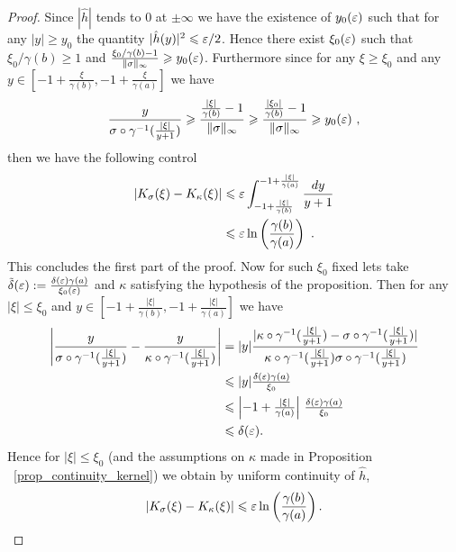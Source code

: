 \begin{proof}
	Since $|\hat{h}|$ tends to $0$ at $\pm\infty$ we have the existence of $y_0(\varepsilon)$ such that for any $|y|\geqslant y_0$ the quantity $|\hat{h}(y)|^2 \leqslant \varepsilon/2$. Hence there exist $\xi_0(\varepsilon)$ such that $\xi_0/\gamma(b)\geqslant 1$ and $\frac{\xi_0/\gamma(b) -1}{\|\sigma\|_\infty} \geqslant y_0(\varepsilon)$.
	Furthermore since for any $\xi\geqslant \xi_0$ and any $y\in[-1+\frac{\xi}{\gamma(b)},-1+\frac{\xi}{\gamma(a)}]$ we have
	\begin{equation}
		\frac{y}{\sigma\circ\gamma^{-1}(\frac{|\xi|}{y+1})} \geqslant \frac{\frac{|\xi|}{\gamma(b)}-1}{\|\sigma\|_\infty}\geqslant \frac{\frac{|\xi_0|}{\gamma(b)}-1}{\|\sigma\|_\infty} \geqslant y_0(\varepsilon)\ ,
	\end{equation}
	then we have the following control
	\begin{align*}
		|K_\sigma(\xi)-K_\kappa(\xi)| & \leqslant \varepsilon\int_{-1+\frac{|\xi|}{\gamma(b)}}^{-1+\frac{|\xi|}{\gamma(a)}} \frac{dy}{y+1} \\
		& \leqslant \varepsilon \ln\left(\frac{\gamma(b)}{\gamma(a)}\right)\ .
	\end{align*}
	This concludes the first part of the proof. Now for such $\xi_0$ fixed lets take $\tilde{\delta}(\varepsilon):=\frac{\delta(\varepsilon)\gamma(a)}{\xi_0(\varepsilon)}$ and $\kappa$ satisfying the hypothesis of the proposition. Then for any $|\xi|\leqslant \xi_0$ and $y\in[-1+\frac{|\xi|}{\gamma(b)},-1+\frac{|\xi|}{\gamma(a)}]$ we have
	\begin{align*}
		\left|\frac{y}{\sigma\circ\gamma^{-1}(\frac{|\xi|}{y+1})}- \frac{y}{\kappa\circ\gamma^{-1}(\frac{|\xi|}{y+1})}\right| &= |y|\frac{|\kappa\circ\gamma^{-1}(\frac{|\xi|}{y+1})-\sigma\circ\gamma^{-1}(\frac{|\xi|}{y+1})|}{\kappa\circ\gamma^{-1}(\frac{|\xi|}{y+1})\sigma\circ\gamma^{-1}(\frac{|\xi|}{y+1})} \\
		& \leqslant |y|\tfrac{\delta(\varepsilon)\gamma(a)}{\xi_0} \\
		& \leqslant \left|-1+\tfrac{|\xi|}{\gamma(a)}\right|\,\tfrac{\delta(\varepsilon)\gamma(a)}{\xi_0} \\
		& \leqslant \delta(\varepsilon).
	\end{align*}
	Hence for $|\xi|\leqslant \xi_0$ (and the assumptions on $\kappa$ made in Proposition ~\ref{prop_continuity_kernel}) we obtain by uniform continuity of $\hat{h}$,
	\begin{equation*}
		|K_\sigma(\xi)-K_\kappa(\xi)|\leqslant \varepsilon \ln\left(\frac{\gamma(b)}{\gamma(a)}\right).
	\end{equation*}
\end{proof}

